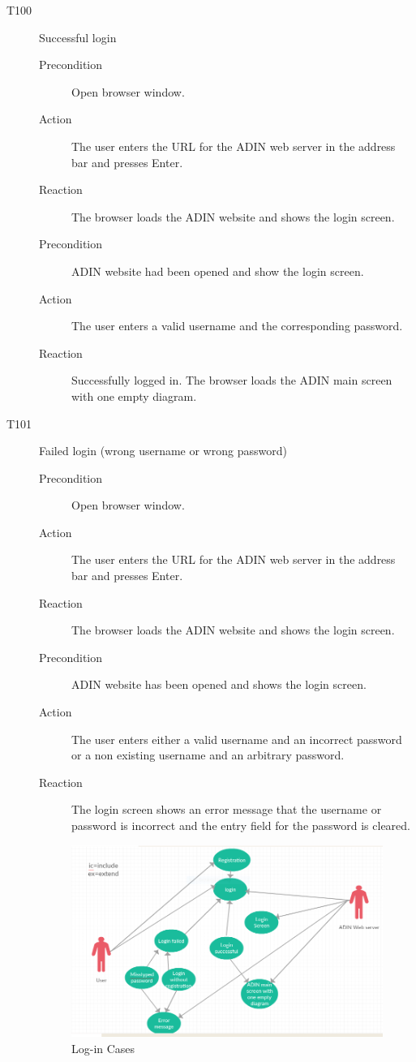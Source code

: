 \documentclass[twoside, english, draft]{Pflichtenheft}
\begin{document}
\begin{description}

  \item[T100] Successful login
\begin{description}
    \item[Precondition]
    Open browser window.
    \item[Action]
    The user enters the URL for the ADIN web server in the address bar and presses Enter.
    \item[Reaction]
    The browser loads the ADIN website and shows the login screen.

    \item[Precondition]
    ADIN website had been opened and show the login screen.
    \item[Action]
    The user enters a valid username and the corresponding password.
    \item[Reaction]
    Successfully logged in. The browser loads the ADIN main screen with one empty diagram.
\end{description}

  \item[T101] Failed login (wrong username or wrong password)
\begin{description}
    \item[Precondition]
    Open browser window.
    \item[Action]
    The user enters the URL for the ADIN web server in the address bar and presses Enter.
    \item[Reaction]
    The browser loads the ADIN website and shows the login screen.

    \item[Precondition]
    ADIN website has been opened and shows the login screen.
    \item[Action]
    The user enters either a valid username and an incorrect password or a non existing username and an arbitrary password.
    \item[Reaction]
    The login screen shows an error message that the username or password is incorrect and the entry field for the password is cleared.
\end{description}

\begin{figure}
\centering
\includegraphics[width=\textwidth]{Images/firstcase.png}
\caption{Log-in Cases}
\end{figure}


\end{description}
\end{document}
